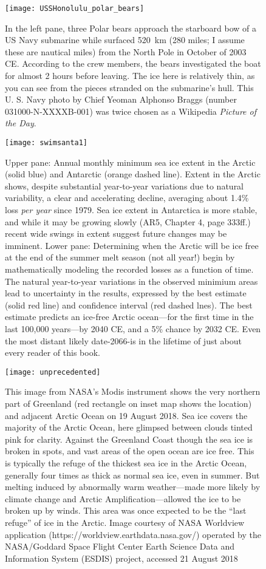 \begin{figure}[p]
	\centering
  \texttt{[image: USSHonolulu\_polar\_bears]}%
	\caption{In the left pane, three Polar bears approach the starboard bow of a US Navy submarine while surfaced \SI{520}{\kilo\metre} (280 miles; I assume these are nautical miles) from the North Pole in October of 2003 CE. According to the crew members, the bears investigated the boat for almost 2 hours before leaving. The ice here is relatively thin, as you can see from the pieces stranded on the submarine's hull. This U. S. Navy photo by Chief Yeoman Alphonso Braggs (number 031000-N-XXXXB-001) was twice chosen as a Wikipedia \textit{Picture of the Day}.}
	\label{fig:sub_polar}
\end{figure}


\begin{figure}[p]
	\centering
  \texttt{[image: swimsanta1]}%
	\caption{Upper pane: Annual monthly minimum sea ice extent in the Arctic (solid blue) and Antarctic (orange dashed line). Extent in the Arctic shows, despite substantial year-to-year variations due to natural variability, a clear and accelerating decline, averaging about 1.4\% loss \emph{per year} since 1979. Sea ice extent in Antarctica is more stable, and while it may be growing slowly (AR5, Chapter 4, page 333ff.) recent wide swings in extent suggest future changes may be imminent. Lower pane: Determining when the Arctic will be ice free at the end of the summer melt season (not all year!) begin by mathematically modeling the recorded losses as a function of time. The natural year-to-year variations in the observed minimium areas lead to uncertainty in the results, expressed by the best estimate (solid red line) and confidence interval (red dashed lnes). The best estimate predicts an ice-free Arctic ocean---for the first time in the last 100,000 years---by 2040 CE, and a 5\% chance by 2032 CE. Even the most distant likely date-2066-is in the lifetime of just about every reader of this book.    }
	\label{fig:min_ice}
\end{figure}

\begin{figure}[p]
	\centering
  \texttt{[image: unprecedented]}%
	\caption{This image from NASA's Modis instrument shows the very northern part of Greenland (red rectangle on inset map shows the location) and adjacent Arctic Ocean on 19 August 2018. Sea ice covers the majority of the Arctic Ocean, here glimpsed between clouds tinted pink for clarity. Against the Greenland Coast though the sea ice is broken in spots, and vast areas of the open ocean are ice free. This is typically the refuge of the thickest sea ice in the Arctic Ocean, generally four times as thick as normal sea ice, even in summer. But melting induced by abnormally warm weather---made more likely by climate change and Arctic Amplification---allowed the ice to be broken up by winds. This area was once expected to be the ``last refuge'' of ice in the Arctic. Image courtesy of NASA Worldview application (https://worldview.earthdata.nasa.gov/) operated by the NASA/Goddard Space Flight Center Earth Science Data and Information System (ESDIS) project, accessed 21 August 2018}
	\label{fig:breakup}
\end{figure}


